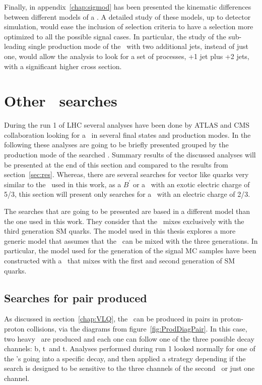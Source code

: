 Finally, in appendix~\ref{chap:sigmod} has been presented the kinematic differences between different models of a \Tp. A detailed study of these models, up to detector simulation, would ease the inclusion of selection criteria to have a selection more optimized to all the possible signal cases. In particular, the study of the sub-leading single production mode of the \Tp~with two additional jets, instead of just one, would allow the analysis to look for a set of processes, \Tp+1 jet plus \Tp+2 jets, with a significant higher cross section. 

\section{Other \Tp~searches}
\label{sec:art}

During the run 1 of LHC several analyses have been done by ATLAS and CMS collaboration looking for a \Tp~in several final states and production modes. In the following these analyses are going to be briefly presented grouped by the production mode of the searched \Tp. Summary results of the discussed analyses will be presented at the end of this section and compared to the results from section~\ref{sec:res}. Whereas, there are several searches for vector like quarks very similar to the \Tp~used in this work, as a $B^{'}$ or a \Tp~with an exotic electric charge of 5/3, this section will present only searches for a \Tp~with an electric charge of 2/3. 

The searches that are going to be presented are based in a different model than the one used in this work. They consider that the \Tp~mixes exclusively with the third generation SM quarks. The model used in this thesis explores a more generic model that assumes that the \Tp~can be mixed with the three generations. In particular, the model used for the generation of the signal MC samples have been constructed with a \Tp~that mixes with the first and second generation of SM quarks.

\subsection{Searches for pair produced \Tp}
\label{sec:pairanal}

As discussed in section~\ref{chap:VLQ}, the \Tp~can be produced in pairs in proton-proton collisions, via the diagrams from figure~\ref{fig:ProdDiagPair}. In this case, two heavy \Tp~are produced and each one can follow one of the three possible decay channels: b\W, t\Z~and t\Hb. Analyses performed during run 1 looked normally for one of the \Tp's going into a specific decay, and then applied a strategy depending if the search is designed to be sensitive to the three channels of the second \Tp~or just one channel. 

